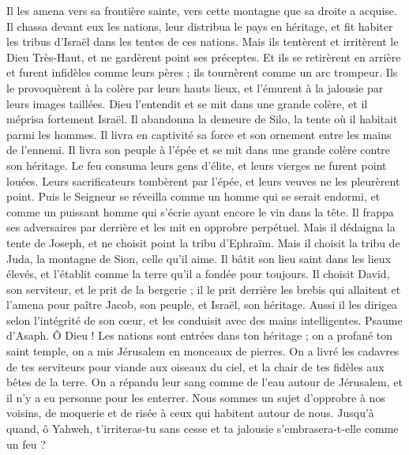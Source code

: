 \begin{multicols}{2}
Il les amena vers sa frontière sainte, vers cette montagne que sa droite a acquise.
Il chassa devant eux les nations, leur distribua le pays en héritage, et fit habiter les tribus d'Israël dans les tentes de ces nations.
Mais ils tentèrent et irritèrent le Dieu Très-Haut, et ne gardèrent point ses préceptes.
Et ils se retirèrent en arrière et furent infidèles comme leurs pères ; ils tournèrent comme un arc trompeur.
Ils le provoquèrent à la colère par leurs hauts lieux, et l'émurent à la jalousie par leurs images taillées.
Dieu l'entendit et se mit dans une grande colère, et il méprisa fortement Israël.
Il abandonna la demeure de Silo, la tente où il habitait parmi les hommes.
Il livra en captivité sa force et son ornement entre les mains de l'ennemi.
Il livra son peuple à l'épée et se mit dans une grande colère contre son héritage.
Le feu consuma leurs gens d'élite, et leurs vierges ne furent point louées.
Leurs sacrificateurs tombèrent par l'épée, et leurs veuves ne les pleurèrent point.
Puis le Seigneur se réveilla comme un homme qui se serait endormi, et comme un puissant homme qui s'écrie ayant encore le vin dans la tête.
Il frappa ses adversaires par derrière et les mit en opprobre perpétuel.
Mais il dédaigna la tente de Joseph, et ne choisit point la tribu d'Ephraïm.
Mais il choisit la tribu de Juda, la montagne de Sion, celle qu'il aime.
Il bâtit son lieu saint dans les lieux élevés, et l'établit comme la terre qu'il a fondée pour toujours.
Il choisit David, son serviteur, et le prit de la bergerie ;
il le prit derrière les brebis qui allaitent et l'amena pour paître Jacob, son peuple, et Israël, son héritage.
Aussi il les dirigea selon l'intégrité de son cœur, et les conduisit avec des mains intelligentes.
\VerseOne{}Psaume d'Asaph. Ô Dieu ! Les nations sont entrées dans ton héritage ; on a profané ton saint temple, on a mis Jérusalem en monceaux de pierres.
On a livré les cadavres de tes serviteurs pour viande aux oiseaux du ciel, et la chair de tes fidèles aux bêtes de la terre.
On a répandu leur sang comme de l'eau autour de Jérusalem, et il n'y a eu personne pour les enterrer.
Nous sommes un sujet d'opprobre à nos voisins, de moquerie et de risée à ceux qui habitent autour de nous.
Jusqu'à quand, ô Yahweh, t'irriteras-tu sans cesse et ta jalousie s'embrasera-t-elle comme un feu ?

\end{multicols}
